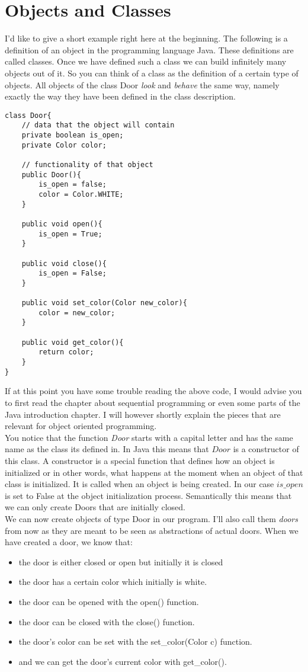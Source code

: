 \documentclass{scrreprt}
\begin{document}
\section{Objects and Classes}
I'd like to give a short example right here at the beginning. The following is a definition of an object in the programming language Java. These definitions are called classes. Once we have defined such a class we can build infinitely many objects out of it. So you can think of a class as the definition of a certain type of objects. All objects of the class Door \textit{look} and \textit{behave} the same way, namely exactly the way they have been defined in the class description.
\lstset{language=Java}
\begin{lstlisting}
class Door{
	// data that the object will contain
	private boolean is_open;
	private Color color;

	// functionality of that object
	public Door(){
		is_open = false;
		color = Color.WHITE;
	}

	public void open(){
		is_open = True;
	}

	public void close(){
		is_open = False;
	}

	public void set_color(Color new_color){
		color = new_color;
	}

	public void get_color(){
		return color;
	}
}
\end{lstlisting}

If at this point you have some trouble reading the above code, I would advise you to first read the chapter about sequential programming or even some parts of the Java introduction chapter. I will however shortly explain the pieces that are relevant for object oriented programming. \\
You notice that the function \textit{Door} starts with a capital letter and has the same name as the class its defined in. In Java this means that $Door$ is a constructor of this class. A constructor is a special function that defines how an object is initialized or in other words, what happens at the moment when an object of that class is initialized. It is called when an object is being created. In our case $is\_open$ is set to False at the object initialization process. Semantically this means that we can only create Doors that are initially closed. \\
We can now create objects of type Door in our program. I'll also call them \textit{doors} from now as they are meant to be seen as abstractions of actual doors. When we have created a door, we know that:
\begin{itemize}
\item the door is either closed or open but initially it is closed
\item the door has a certain color which initially is white.
\item the door can be opened with the open() function.
\item the door can be closed with the close() function.
\item the door's color can be set with the set\_color(Color c) function.
\item and we can get the door's current color with get\_color().
\end{itemize}
\end{document}
